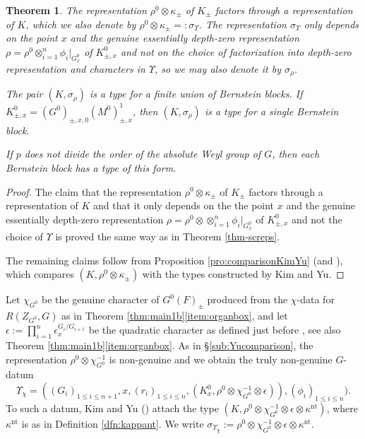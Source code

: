 \documentclass{article}
\newcommand{\eps}{\epsilon}
\newtheorem{thm}{Theorem}[subsection]
\theoremstyle{definition}
\numberwithin{equation}{subsection}
\renewcommand{\-}{\hyp{}}
\begin{document}
\begin{thm} \label{thm-types}
	The representation $\rho^0 \otimes \kappa_{\pm}$ of $K_{\pm}$ factors through a representation of $K$, which we also denote by $\rho^0 \otimes \kappa_{\pm}=:\sigma_\Upsilon$. The representation $\sigma_\Upsilon$ only depends on the point $x$ and the genuine essentially depth-zero representation $\rho=\rho^0 \otimes_{i=1}^n \phi_i|_{G^0_x}$ of $K^0_{\pm, x}$ and not on the choice of factorization into depth-zero representation and characters in $\Upsilon$, so we may also denote it by $\sigma_\rho$.
	
	The pair $(K, \sigma_\rho)$ is a type for a finite union of Bernstein blocks. If $K^0_{\pm, x}= (G^0)_{\pm, x, 0}(M^0)^1_{\pm, x}$, then $(K, \sigma_\rho)$ is a type for a single Bernstein block.
	
	If $p$ does not divide the order of the absolute Weyl group of $G$, then each Bernstein block has a type of this form.
\end{thm}
\begin{proof}
	The claim that the representation $\rho^0 \otimes \kappa_{\pm}$ of $K_{\pm}$ factors through a representation of $K$ and that it only depends on the the point $x$ and the genuine essentially depth-zero representation $\rho=\rho^0 \otimes \otimes_{i=1}^n \phi_i|_{G^0_x}$ of $K^0_{\pm, x}$ and not the choice of $\Upsilon$ is proved the same way as in Theorem \ref{thm-screps}.
	
	The remaining claims follow from Proposition \ref{pro:comparisonKimYu} (and \cite{KimYu, Fin21Comp, Kim07, Fin21}), which compares $(K, \rho^0 \otimes \kappa_{\pm})$  with the types constructed by Kim and Yu.
\end{proof}



Let $\chi_{G^0}$ be the genuine character of $G^0(F)_{\pm}$ produced from the $\chi$-data for $R(Z_{G^0},G)$ as in Theorem \ref{thm:main1b}\eqref{item:organbox}, and let $\eps:=\prod_{i=1}^n \eps_x^{G_i/G_{i+1}}$ be the quadratic character as defined just before \cite[Theorem~4.1.13]{FKS23}, see also Theorem \ref{thm:main1b}\eqref{item:organbox}. As in \S\ref{sub:Yucomparison}, the representation $\rho^0 \otimes \chi_{G^0}^{-1}$ is non-genuine and we obtain the truly non-genuine $G$-datum 
\[\Upsilon_\chi=((G_i)_{1\leq i\leq n+1},x,(r_i)_{1\leq i\leq n},(K^0_x, \rho^0 \otimes \chi_{G^0}^{-1} \otimes \eps)),(\phi_i)_{1\leq i\leq n}) .\] 
To such a datum, Kim and Yu (\cite{KimYu}) attach the type $(K,  \rho^0 \otimes \chi_{G^0}^{-1} \otimes \eps \otimes \kappa^{\mathrm{nt}})$, where $\kappa^{\mathrm{nt}}$ is as in Definition \ref{dfn:kappant}. We write $\sigma_{\Upsilon_\chi}:= \rho^0 \otimes \chi_{G^0}^{-1} \otimes \eps \otimes  \kappa^{\mathrm{nt}}$.
\end{document}
